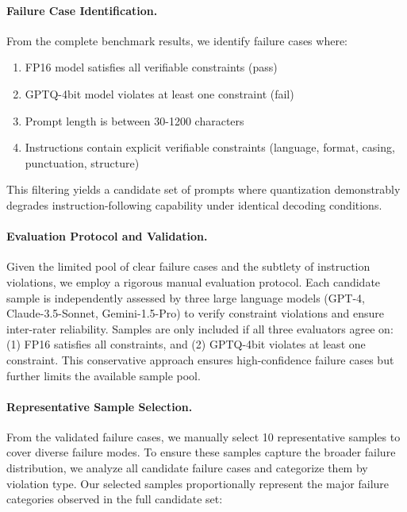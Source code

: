 \paragraph{Failure Case Identification.}
From the complete benchmark results, we identify failure cases where:
\begin{enumerate}
    \item FP16 model satisfies all verifiable constraints (pass)
    \item GPTQ-4bit model violates at least one constraint (fail)
    \item Prompt length is between 30-1200 characters
    \item Instructions contain explicit verifiable constraints (language, format, 
          casing, punctuation, structure)
\end{enumerate}

This filtering yields a candidate set of prompts where quantization demonstrably 
degrades instruction-following capability under identical decoding conditions.

\paragraph{Evaluation Protocol and Validation.}
Given the limited pool of clear failure cases and the subtlety of instruction 
violations, we employ a rigorous manual evaluation protocol. Each candidate 
sample is independently assessed by three large language models (GPT-4, 
Claude-3.5-Sonnet, Gemini-1.5-Pro) to verify constraint violations and ensure 
inter-rater reliability. Samples are only included if all three evaluators agree 
on: (1) FP16 satisfies all constraints, and (2) GPTQ-4bit violates at least one 
constraint. This conservative approach ensures high-confidence failure cases but 
further limits the available sample pool.

\paragraph{Representative Sample Selection.}
From the validated failure cases, we manually select 10 representative 
samples to cover diverse failure modes. To ensure these samples capture 
the broader failure distribution, we analyze all candidate failure cases 
and categorize them by violation type. Our selected samples proportionally 
represent the major failure categories observed in the full candidate set:

